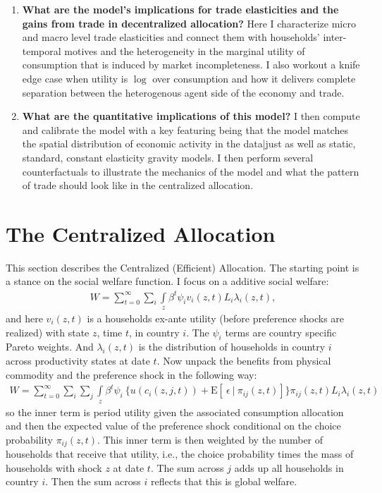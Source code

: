 \documentclass[12pt,pdftex]{article}
\begin{document}
\begin{onehalfspacing}
\begin{enumerate}
\item \textbf{What are the model's implications for trade elasticities and the gains from trade in decentralized allocation?} Here I characterize micro and macro level trade elasticities and connect them with households' inter-temporal motives and the heterogeneity in the marginal utility of consumption that is induced by market incompleteness. I also workout a knife edge case when utility is $\log$ over consumption and how it delivers complete separation between the heterogenous agent side of the economy and trade.

\item \textbf{What are the quantitative implications of this model?} I then compute and calibrate the model with a key featuring being that the model matches the spatial distribution of economic activity in the data|just as well as static, standard, constant elasticity gravity models. I then perform several counterfactuals to illustrate the mechanics of the model and what the pattern of trade should look like in the centralized allocation.
\end{enumerate}

\section{The Centralized Allocation}\label{sec:planner}

This section describes the Centralized (Efficient) Allocation. The starting point is a stance on the social welfare function. I focus on a additive social welfare:
\begin{align}
W = \sum_{t=0}^{\infty} \sum_{i}  \int\limits_{z} \beta^{t} \psi_{i} v_{i}(z,t) L_{i}\lambda_{i}(z,t),
\nonumber
\end{align}
and here $v_i(z,t)$ is a households ex-ante utility (before preference shocks are realized) with state $z$, time $t$, in country $i$. The $\psi_{i}$ terms are country specific Pareto weights. And $\lambda_{i}(z,t)$ is the distribution of households in country $i$ across productivity states at date $t$. Now unpack the benefits from physical commodity and the preference shock in the following way:
\begin{align}
W = \sum_{t=0}^{\infty}  \sum_{i} \sum_{j} \int\limits_{z}  \beta^{t} \psi_{i} \  \bigg \{  u(c_{i}(z, j, t) ) + \mathrm{E}[ \ \epsilon \ | \ \pi_{ij}(z,t) ] \bigg \}\pi_{ij}(z,t) L_{i} \lambda_{i}(z, t)
\label{eq:social-welfare-2}
\end{align}
so the inner term is period utility given the associated consumption allocation and then the expected value of the preference shock conditional on the choice probability $\pi_{ij}(z,t)$. This inner term is then weighted by the number of households that receive that utility, i.e., the choice probability times the mass of households with shock $z$ at date $t$. The sum across $j$ adds up all households in country $i$. Then the sum across $i$ reflects that this is global welfare.


\end{onehalfspacing}
\end{document}
